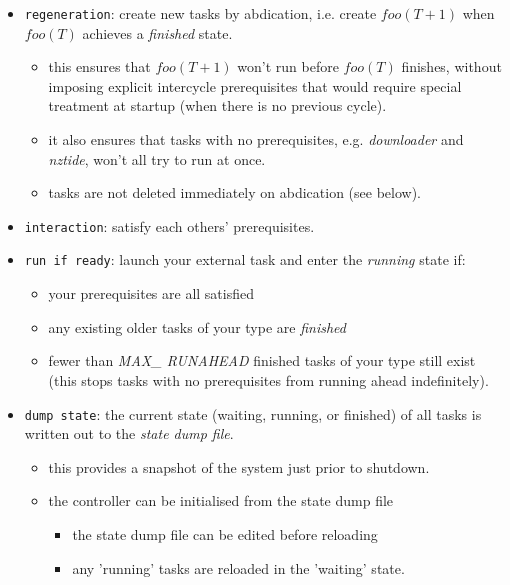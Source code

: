 \documentclass[12pt]{amsart}
\begin{document}
    \begin{itemize} 
    \item \verb#regeneration#: create new tasks by abdication, i.e.
    create $foo(T+1)$ when $foo(T)$ achieves a {\em finished} state.
    \begin{itemize}
    \item this ensures that $foo(T+1)$ won't run before $foo(T)$
    finishes, without imposing explicit intercycle prerequisites
    that would require special treatment at startup (when there is no
    previous cycle). 
    \item it also ensures that tasks with no prerequisites, e.g.
    {\em downloader} and {\em nztide}, won't all try to run at once.
    \item tasks are not deleted immediately on abdication (see below). 
    \end{itemize}


    \item \verb#interaction#: satisfy each others' prerequisites. 

    \item \verb#run if ready#: launch your external task and enter the
    {\em running} state if:
        \begin{itemize}
        \item your prerequisites are all satisfied
        \item any existing older tasks of your type are {\em finished} 
        \item fewer than {\em MAX\_ RUNAHEAD} finished tasks of your
        type still exist (this stops tasks with no prerequisites from
        running ahead indefinitely).
        \end{itemize}

    \item \verb#dump state#: the current state (waiting, running, or
    finished) of all tasks is written out to the {\em state dump file}.
        \begin{itemize}
        \item this provides a snapshot of the system just prior to shutdown.

        \item the controller can be initialised from the state dump file
            \begin{itemize}
            \item the state dump file can be edited before reloading

            \item any 'running' tasks are reloaded in the 'waiting' state.
            \end{itemize}
        \end{itemize}


\end{itemize}
\end{document}
